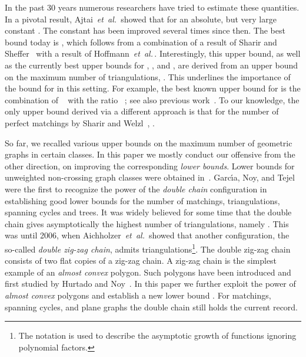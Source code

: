 \documentclass[11pt]{article}
\def\etal{{\it et~al.}\,}
\begin{document}
In the past 30 years numerous researchers have tried to estimate these
quantities. In a pivotal result, Ajtai~\etal\cite{ACNS82} showed
that  for an absolute, but very large constant .
The constant  has been improved several times since then. The best
bound today is , which follows from a combination of a
result of Sharir and Sheffer~\cite{SS10} with a result of
Hoffmann~\etal\cite{HSSTW11}. Interestingly, this upper bound, as well as
the currently best upper bounds for , , and ,
are derived from an upper bound on the maximum number of triangulations, .
This underlines the importance of the bound for  in this setting.
For example, the best known upper bound for  is the combination of
~\cite{SS10} with the ratio
~\cite{HSSTW11};
see also previous work~\cite{RSW08,SS03,SW06,SW06b}.
To our knowledge, the only upper bound derived via a different
approach is that for the number of perfect matchings by
Sharir and Welzl~\cite{SW06}, .

So far, we recalled various upper bounds on the maximum number of
geometric graphs in certain classes. In this paper we mostly conduct
our offensive from the other direction, on improving the corresponding
\emph{lower bounds}. Lower bounds for unweighted non-crossing graph
classes were obtained in~\cite{AHV+06,D99,GNT00}.
Garc\'{\i}a, Noy, and Tejel~\cite{GNT00} were the first to recognize
the power of the {\em double chain} configuration in establishing
good lower bounds for the number of matchings, triangulations, spanning cycles and
trees. It was widely believed for some time that the double chain
gives asymptotically the highest number of triangulations, namely .
This was until 2006, when Aichholzer~\etal\cite{AHV+06} showed that another
configuration, the so-called {\em double zig-zag chain},
admits 
triangulations\footnote{The  notation is used to
describe the asymptotic growth of functions ignoring polynomial
factors.}.
The double zig-zag chain consists of two flat copies of a zig-zag chain.
A zig-zag chain is the simplest example of an {\em almost convex}
polygon. Such polygons have been introduced and first studied by
Hurtado and Noy~\cite{HN97}. In this paper we further exploit
the power of {\em almost convex} polygons and establish a new lower bound
. For matchings, spanning cycles, and plane graphs
the double chain still holds the current record.
\end{document}
